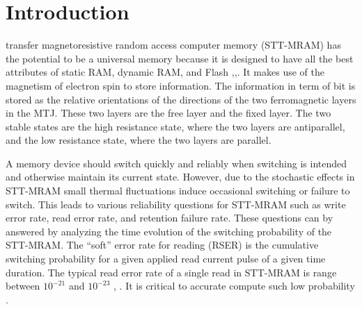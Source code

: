 \documentclass[journal,transmag]{IEEEtran}
\begin{document}
%
\IEEEpeerreviewmaketitle



\section{Introduction}
% 
% 
% 
% 
 transfer magnetoresistive random access computer memory (STT-MRAM) has the potential to be a universal memory because it is designed to have all the best attributes of static RAM, dynamic RAM, and Flash  \cite{5467394},\cite{5424368},\cite{4242474}. It makes use of the magnetism of electron spin to store information. The information in term of bit is stored as the relative orientations of the directions of the two ferromagnetic layers in the MTJ. These two layers are the free layer and the fixed layer. The two stable states are the high resistance state, where the two layers are antiparallel, and the low resistance state, where the two layers are parallel. 

A memory device should switch quickly and reliably when switching is intended and otherwise maintain its current state. However, due to the stochastic effects in STT-MRAM small thermal fluctuations induce occasional switching or failure to switch. This leads to various reliability questions for STT-MRAM such as write error rate, read error rate, and retention failure rate. These questions can by answered by analyzing the time evolution of the switching probability of the STT-MRAM.  The ``soft'' error rate for reading (RSER) is the cumulative switching probability for a given applied read current pulse of a given time duration. The typical read error rate of a single read in STT-MRAM is range between $10^{-21}$ and $10^{-23}$ \cite{7035342}, \cite{Apalkov:2013:STM:2463585.2463589}. It is critical to accurate compute such low probability \cite{6332615}.
\end{document}
